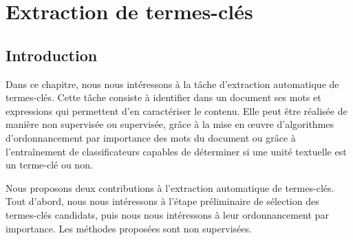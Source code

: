 \chapter{Extraction de termes-clés}
\label{chap:main-domain_independent_keyphrase_extraction}


  \section{Introduction}
  \label{sec:main:domain_independent_keyphrase_extraction-introduction}
    Dans ce chapitre, nous nous intéressons à la tâche d'extraction automatique
    de termes-clés. Cette tâche consiste à identifier dans un document ses mots
    et expressions qui permettent d'en caractériser le contenu. Elle peut être
    réalisée de manière non supervisée ou supervisée, grâce à la mise en
    \oe{}uvre d'algorithmes d'ordonnancement par importance des mots du document
    ou grâce à l'entraînement de classificateurs capables de déterminer si une
    unité textuelle est un terme-clé ou non.

    Nous proposons deux contributions à l'extraction automatique de termes-clés.
    Tout d'abord, nous nous intéressons à l'étape préliminaire de sélection des
    termes-clés candidats, puis nous nous intéressons à leur ordonnancement par
    importance. Les méthodes proposées sont non supervisées.


